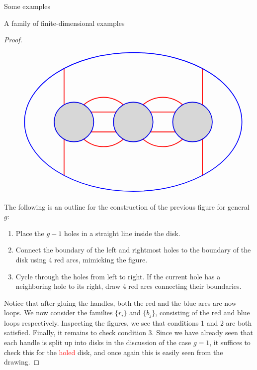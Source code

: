 \begin{chapter}{Some examples}
\begin{section}{A family of finite-dimensional examples}
\begin{proof}
\begin{figure}[h]
\[\begin{tikzpicture}
\draw[red, very thick] (-3.5,0.87) -- (-3.5,2.7);
\draw[red, very thick] (-3.5,-0.87) -- (-3.5,-2.7);
\draw[red, very thick] (3.5,0.87) -- (3.5,2.7);
\draw[red, very thick] (3.5,-0.87) -- (3.5,-2.7);

\draw[red, very thick] (-2.137, 0.5) -- (-0.863, 0.5);
\draw[red, very thick] (-2.137, -0.5) -- (-0.863, -0.5);
\draw[red, very thick] (2.137, 0.5) -- (0.863, 0.5);
\draw[red, very thick] (2.137, -0.5) -- (0.863, -0.5);

\draw[red, very thick] (-2.5,0.87) to [bend left=40] (-0.5,0.87);
\draw[red, very thick] (2.5,0.87) to [bend right=40] (0.5,0.87);
\draw[red, very thick] (-2.5,-0.87) to [bend right=40] (-0.5,-0.87);
\draw[red, very thick] (2.5,-0.87) to [bend left=40] (0.5,-0.87);

\draw[blue, very thick] (0,0) ellipse (5.5cm and 3.5cm);
\draw[blue, very thick] (0,0) circle (1cm);
\draw[blue, very thick] (-3,0) circle (1cm);
\draw[blue, very thick] (3,0) circle (1cm);
\fill [black,opacity=.15] (-3,0) circle (1cm);
\fill [black,opacity=.15] (0,0) circle (1cm);
\fill [black,opacity=.15] (3,0) circle (1cm);
\end{tikzpicture}
\]
\end{figure}

The following is an outline for the construction of the previous figure for general $g$:
\begin{enumerate}
\item Place the $g-1$ holes in a straight line inside the disk.
\item Connect the boundary of the left and rightmost holes to the boundary of the disk using 4 red arcs, mimicking the figure.
\item Cycle through the holes from left to right. If the current hole has a neighboring hole to its right, draw 4 red arcs connecting their boundaries.
\end{enumerate}

Notice that after gluing the handles, both the red and the blue arcs are now loops. We now consider the families $\{r_i\}$ and $\{b_j\}$, consisting of the red and blue loops respectively. Inspecting the figures, we see that conditions 1 and 2 are both satisfied. Finally, it remains to check condition 3. Since we have already seen that each handle is split up into disks in the discussion of the case $g=1$, it suffices to check this for the \textcolor{red}{holed} disk, and once again this is easily seen from the drawing.
\end{proof}


\end{section}
\end{chapter}
